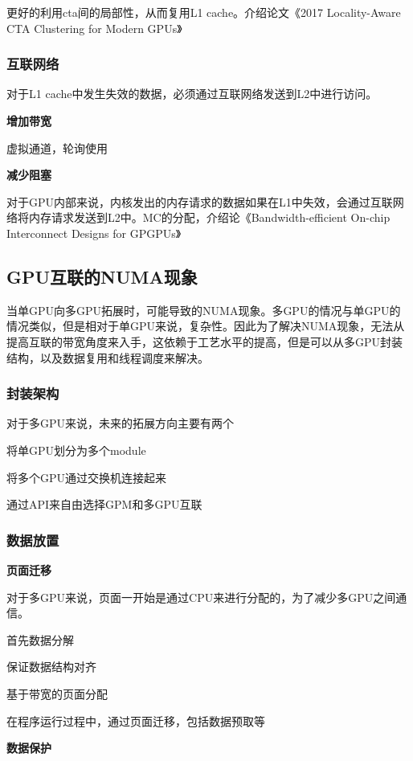 \documentclass{cjc}
\begin{document}
更好的利用cta间的局部性，从而复用L1 cache。介绍论文《2017 Locality-Aware CTA Clustering for Modern GPUs》

\subsubsection{互联网络}

对于L1 cache中发生失效的数据，必须通过互联网络发送到L2中进行访问。

\textbf{增加带宽}

虚拟通道，轮询使用
  
\textbf{减少阻塞}

对于GPU内部来说，内核发出的内存请求的数据如果在L1中失效，会通过互联网络将内存请求发送到L2中。MC的分配，介绍论《Bandwidth-efficient On-chip Interconnect Designs for GPGPUs》


\subsection{GPU互联的NUMA现象}

当单GPU向多GPU拓展时，可能导致的NUMA现象。多GPU的情况与单GPU的情况类似，但是相对于单GPU来说，复杂性。因此为了解决NUMA现象，无法从提高互联的带宽角度来入手，这依赖于工艺水平的提高，但是可以从多GPU封装结构，以及数据复用和线程调度来解决。

\subsubsection{封装架构}

对于多GPU来说，未来的拓展方向主要有两个

将单GPU划分为多个module

将多个GPU通过交换机连接起来

通过API来自由选择GPM和多GPU互联

\subsubsection{数据放置}

\textbf{页面迁移}

对于多GPU来说，页面一开始是通过CPU来进行分配的，为了减少多GPU之间通信。

首先数据分解

保证数据结构对齐

基于带宽的页面分配

在程序运行过程中，通过页面迁移，包括数据预取等
  
\textbf{数据保护}
\end{document}
